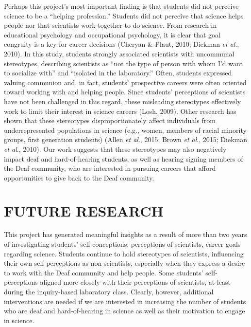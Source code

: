 \documentclass[11.5pt]{sig-alternate} %
\begin{document}
\begin{large}
Perhaps this project’s most important finding is that students did not perceive science to be a “helping profession.” Students did not perceive that science helps people nor that scientists work together to do science. From research in educational psychology and occupational psychology, it is clear that goal congruity is a key for career decisions (Cheryan \& Plaut, 2010; Diekman \textit{et al}., 2010). In this study, students strongly associated scientists with uncommunal stereotypes, describing scientists as “not the type of person with whom I’d want to socialize with” and “isolated in the laboratory.” Often, students expressed valuing communion and, in fact, students’ prospective careers were often oriented toward working with and helping people. Since students’ perceptions of scientists have not been challenged in this regard, these misleading stereotypes effectively work to limit their interest in science careers (Losh, 2009). Other research has shown that these stereotypes disproportionately affect individuals from underrepresented populations in science (e.g., women, members of racial minority groups, first generation students) (Allen \textit{et al}., 2015; Brown \textit{et al}., 2015; Diekman \textit{et al}., 2010). Our work suggests that these stereotypes may also negatively impact deaf and hard-of-hearing students, as well as hearing signing members of the Deaf community, who are interested in pursuing careers that afford opportunities to give back to the Deaf community. 

\section*{FUTURE RESEARCH}

This project has generated meaningful insights as a result of more than two years of investigating students’ self-conceptions, perceptions of scientists, career goals regarding science. Students continue to hold stereotypes of scientists, influencing their own self-perceptions as non-scientists, especially when they express a desire to work with the Deaf community and help people. Some students’ self-perceptions aligned more closely with their perceptions of scientists, at least during the inquiry-based laboratory class. Clearly, however, additional interventions are needed if we are interested in increasing the number of students who are deaf and hard-of-hearing in science as well as their motivation to engage in science.


\end{large}
\end{document}
